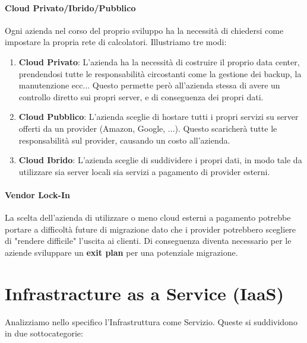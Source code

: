 \documentclass{article}
\begin{document}
\paragraph{Cloud Privato/Ibrido/Pubblico} Ogni azienda nel corso del proprio sviluppo ha la necessità di chiedersi come impostare la propria rete di calcolatori. Illustriamo tre modi:

\begin{enumerate}
    \item \textbf{Cloud Privato}: L'azienda ha la necessità di costruire il proprio data center, prendendosi tutte le responsabilità circostanti come la gestione dei backup, la manutenzione ecc... Questo permette però all'azienda stessa di avere un controllo diretto sui propri server, e di conseguenza dei propri dati.
    \item \textbf{Cloud Pubblico}: L'azienda sceglie di hostare tutti i propri servizi su server offerti da un provider (Amazon, Google, ...). Questo scaricherà tutte le responsabilità sul provider, causando un costo all'azienda.
    \item \textbf{Cloud Ibrido}: L'azienda sceglie di suddividere i propri dati, in modo tale da utilizzare sia server locali sia servizi a pagamento di provider esterni.
\end{enumerate}

\paragraph{Vendor Lock-In} La scelta dell'azienda di utilizzare o meno cloud esterni a pagamento potrebbe portare a difficoltà future di migrazione dato che i provider potrebbero scegliere di "rendere difficile" l'uscita ai clienti. Di conseguenza diventa necessario per le aziende sviluppare un \textbf{exit plan} per una potenziale migrazione.

\newpage

\section{Infrastracture as a Service (IaaS)}

Analizziamo nello specifico l'Infrastruttura come Servizio. Queste si suddividono in due sottocategorie:
\end{document}
